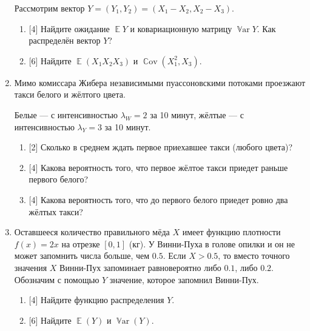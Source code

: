 \documentclass[12pt]{article}
\DeclareMathOperator{\Cov}{\mathbb{C}ov}
\DeclareMathOperator{\Var}{\mathbb{V}ar}
\DeclareMathOperator{\E}{\mathbb{E}}
\begin{document}
\begin{enumerate}
    Рассмотрим вектор $Y = (Y_1, Y_2) = (X_1 - X_2, X_2 - X_3)$.
    \begin{enumerate}
        \item {[4]} Найдите ожидание $\E Y$ и ковариационную матрицу $\Var Y$. Как распределён вектор $Y$?
        \item {[6]} Найдите $\E(X_1 X_2 X_3)$ и $\Cov(X_1^2, X_3)$.
    \end{enumerate}
    
    \item %
    Мимо комиссара Жибера независимыми пуассоновскими потоками проезжают такси белого и жёлтого цвета. 

   Белые — с интенсивностью $\lambda_W = 2$ за 10 минут, жёлтые — с интенсивностью $\lambda_Y = 3$ за 10 минут.
    \begin{enumerate}
        \item {[2]} Сколько в среднем ждать первое приехавшее такси (любого цвета)?
        \item {[4]} Какова вероятность того, что первое жёлтое такси приедет раньше первого белого?
        \item {[4]} Какова вероятность того, что до первого белого приедет ровно два жёлтых такси?
    \end{enumerate}

    \item %
    Оставшееся количество правильного мёда $X$ имеет функцию плотности $f(x) = 2x$ на отрезке $[0, 1]$ (кг).
    У Винни-Пуха в голове опилки и он не может запомнить числа больше, чем $0.5$.
    Если $X > 0.5$, то вместо точного значения $X$ Винни-Пух запоминает равновероятно либо $0.1$, либо $0.2$. 
    Обозначим с помощью $Y$ значение, которое запомнил Винни-Пух. 

    \begin{enumerate}
        \item {[4]} Найдите функцию распределения $Y$.
        \item {[6]} Найдите $\E(Y)$ и $\Var(Y)$.
    \end{enumerate}

\end{enumerate}
\end{document}
